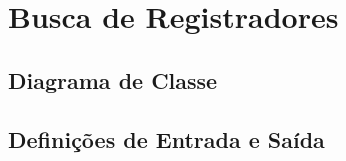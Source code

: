 \documentclass{report}
\begin{document}
  \section{Busca de Registradores}

    \subsection{Diagrama de Classe}
      \begin{figure}[H]
	\centering
      \end{figure} 
     
    \subsection{Definições de Entrada e Saída}
      \FloatBarrier
\end{document}

